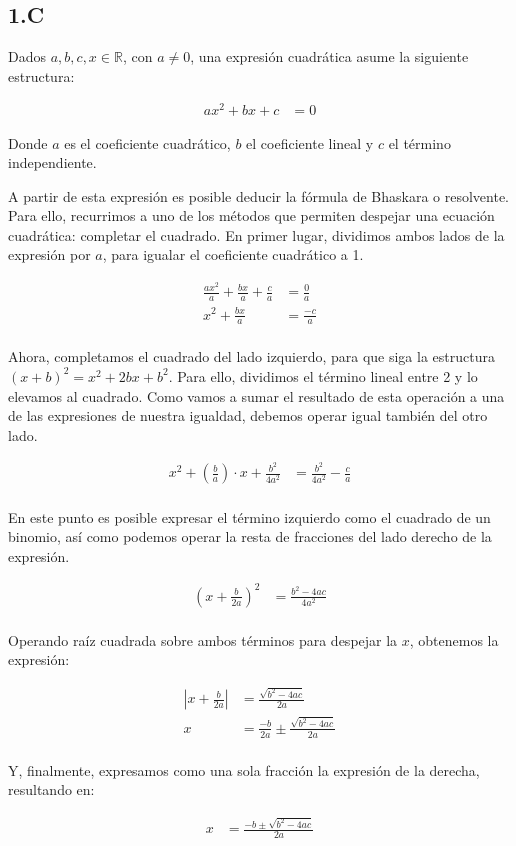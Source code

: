 \subsection*{1.C}

Dados $a, b, c, x \in \mathbb{R}$, con $a \neq 0$, una expresión cuadrática asume la siguiente estructura:

\begin{align*}
	ax^2 + bx + c &= 0
\end{align*}

Donde $a$ es el coeficiente cuadrático, $b$ el coeficiente lineal y $c$ el término independiente.

A partir de esta expresión es posible deducir la fórmula de Bhaskara o resolvente. Para ello, recurrimos a uno de los métodos que permiten despejar una ecuación cuadrática: completar el cuadrado. En primer lugar, dividimos ambos lados de la expresión por $a$, para igualar el coeficiente cuadrático a 1.

\begin{align*}
	\frac{ax^2}{a} + \frac{bx}{a} + \frac{c}{a} &= \frac{0}{a}\\
	x^2 + \frac{bx}{a} &= \frac{-c}{a}\\
\end{align*}

Ahora, completamos el cuadrado del lado izquierdo, para que siga la estructura $(x + b)^2 = x^2 + 2bx + b^2$. Para ello, dividimos el término lineal entre 2 y lo elevamos al cuadrado. Como vamos a sumar el resultado de esta operación a una de las expresiones de nuestra igualdad, debemos operar igual también del otro lado.

\begin{align*}
	x^2 + \left(\frac{b}{a}\right) \cdot x + \frac{b^2}{4a^2} &= \frac{b^2}{4a^2} - \frac{c}{a}\\
\end{align*}

En este punto es posible expresar el término izquierdo como el cuadrado de un binomio, así como podemos operar la resta de fracciones del lado derecho de la expresión.

\begin{align*}
	(x + \frac{b}{2a})^2 &= \frac{b^2 - 4ac}{4a^2}\\
\end{align*}

Operando raíz cuadrada sobre ambos términos para despejar la $x$, obtenemos la expresión:

\begin{align*}
	|x + \frac{b}{2a}| &= \frac{\sqrt{b^2 - 4ac}}{2a}\\
	x &= \frac{-b}{2a} \pm \frac{\sqrt{b^2 - 4ac}}{2a}\\
\end{align*}

Y, finalmente, expresamos como una sola fracción la expresión de la derecha, resultando en:

\begin{align*}
	x &= \frac{-b \pm \sqrt{b^2 - 4ac}}{2a}\\
\end{align*}
